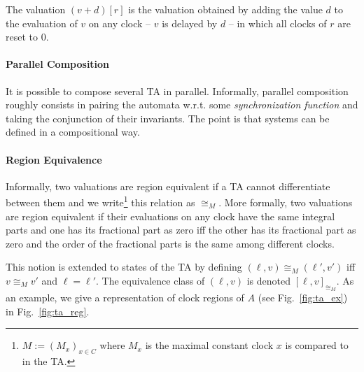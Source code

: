 \documentclass[11pt]{article}
\theoremstyle{definition}
\theoremstyle{remark}
\theoremstyle{definition}
\begin{document}
The valuation $(v+d)[r]$ is the valuation obtained by adding the value $d$ to the evaluation of $v$ on any clock -- $v$ is delayed by $d$ -- in which all clocks of $r$ are reset to $0$.



\paragraph{Parallel Composition}\label{par:ta_parcomp}
It is possible to compose several TA in parallel. Informally, parallel composition roughly consists in pairing the automata w.r.t. some \emph{synchronization function} and taking the conjunction of their invariants. The point is that systems can be defined in a compositional way.

\paragraph{Region Equivalence}\label{par:ta_regeq}
Informally, two valuations are region equivalent if a TA cannot differentiate between them and we write\footnote{$M := (M_x)_{x \in C}$ where $M_x$ is the maximal constant clock $x$ is compared to in the TA.} this relation as $\cong_M$.
More formally, two valuations are region equivalent if their evaluations on any clock have the same integral parts and one has its fractional part as zero iff the other has its fractional part as zero and the order of the fractional parts is the same among different clocks.

This notion is extended to states of the TA by defining $(\ell, v) \cong_M (\ell', v')$ iff $v \cong_M v'$ and $\ell = \ell'$. The equivalence class of $(\ell, v)$ is denoted $[\ell, v]_{\cong_M}$.
As an example, we give a representation of clock regions of $A$ (see Fig.~\ref{fig:ta_ex}) in Fig.~\ref{fig:ta_reg}.
\end{document}
